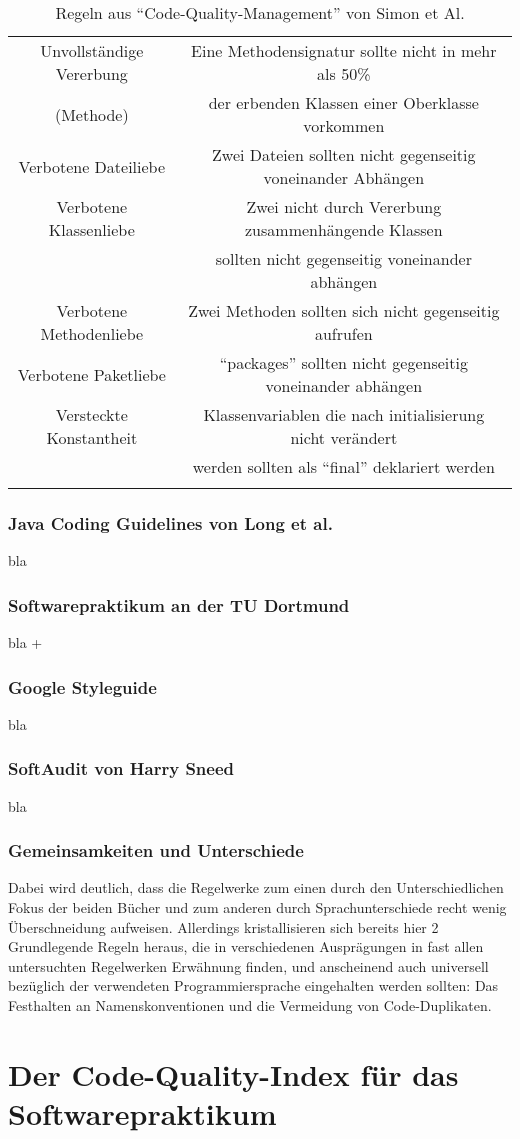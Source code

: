 \documentclass[da,ngerman]{stthesis}
\begin{document}
\begin{center}
\begin{longtabu}{|c|c|}
						\hline
						Unvollständige Vererbung & Eine Methodensignatur sollte nicht in mehr als 50\% \\ (Methode) & der erbenden Klassen einer Oberklasse vorkommen \\
						\hline
						Verbotene Dateiliebe & Zwei Dateien sollten nicht gegenseitig voneinander Abhängen \\
						\hline
						Verbotene Klassenliebe & Zwei nicht durch Vererbung zusammenhängende Klassen \\ & sollten nicht gegenseitig voneinander abhängen \\
						\hline
						Verbotene Methodenliebe & Zwei Methoden sollten sich nicht gegenseitig aufrufen \\
						\hline
						Verbotene Paketliebe & "`packages"' sollten nicht gegenseitig voneinander abhängen \\
						\hline
						Versteckte Konstantheit & Klassenvariablen die nach initialisierung nicht verändert \\ & werden sollten als "`final"' deklariert werden \\
  						\hline
  						\caption{Regeln aus "`Code-Quality-Management"' von Simon et Al. \cite{CodeQualityManagement}}
						\label{indexrules}
  					\end{longtabu}   
  				\end{center}
			\subsection{Java Coding Guidelines von Long et al.}
				bla \cite{JavaCodingGuidelines}
			\subsection{Softwarepraktikum an der TU Dortmund}
				bla \cite{ImproveCodeQuality} + \cite{CleanCodeImPraktikum}
			\subsection{Google Styleguide}
				bla \cite{GoogleStyleGuide}
			\subsection{SoftAudit von Harry Sneed}
				bla \cite{SoftAuditDoku}
			\subsection{Gemeinsamkeiten und Unterschiede}
				Dabei wird deutlich, dass die Regelwerke zum einen durch den Unterschiedlichen Fokus der beiden Bücher und zum anderen durch Sprachunterschiede recht wenig Überschneidung aufweisen. Allerdings kristallisieren sich bereits hier 2 Grundlegende Regeln heraus, die in verschiedenen Ausprägungen in fast allen untersuchten Regelwerken Erwähnung finden, und anscheinend auch universell bezüglich der verwendeten Programmiersprache eingehalten werden sollten: Das Festhalten an Namenskonventionen und die Vermeidung von Code-Duplikaten.
	\chapter{Der Code-Quality-Index für das Softwarepraktikum} \label{indexchapter}
  	\backmatter
  
  	\appendix
  	
  
\end{document}
